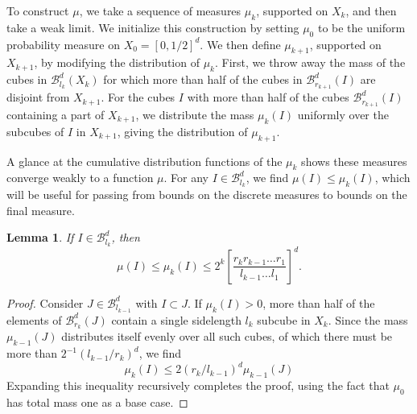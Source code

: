 \documentclass[dvipsnames]{article}
\theoremstyle{plain}
\newtheorem{lemma}{Lemma}
\theoremstyle{plain}
\begin{document}
To construct $\mu$, we take a sequence of measures $\mu_k$, supported on $X_k$, and then take a weak limit. We initialize this construction by setting $\mu_0$ to be the uniform probability measure on $X_0 = [0,1/2]^d$. We then define $\mu_{k+1}$, supported on $X_{k+1}$, by modifying the distribution of $\mu_k$. First, we throw away the mass of the cubes in $\mathcal{B}^d_{l_k}(X_k)$ for which more than half of the cubes in $\mathcal{B}^d_{r_{k+1}}(I)$ are disjoint from $X_{k+1}$. For the cubes $I$ with more than half of the cubes $\mathcal{B}^d_{r_{k+1}}(I)$ containing a part of $X_{k+1}$, we distribute the mass $\mu_k(I)$ uniformly over the subcubes of $I$ in $X_{k+1}$, giving the distribution of $\mu_{k+1}$.

A glance at the cumulative distribution functions of the $\mu_k$ shows these measures converge weakly to a function $\mu$. For any $I \in \mathcal{B}^d_{l_k}$, we find $\mu(I) \leq \mu_k(I)$, which will be useful for passing from bounds on the discrete measures to bounds on the final measure.

\begin{lemma}
	If $I \in \mathcal{B}^d_{l_k}$, then
	\begin{equation} \label{measurebound}
		\mu(I) \leq \mu_k(I) \leq 2^k \left[ \frac{r_k r_{k-1} \dots r_1}{l_{k-1} \dots l_1} \right]^d.
	\end{equation}
\end{lemma}
\begin{proof}
	Consider $J \in \mathcal{B}^d_{l_{k-1}}$ with $I \subset J$. If $\mu_k(I) > 0$, more than half of the elements of $\mathcal{B}^d_{r_k}(J)$ contain a single sidelength $l_k$ subcube in $X_k$. Since the mass $\mu_{k-1}(J)$ distributes itself evenly over all such cubes, of which there must be more than $2^{-1} (l_{k-1} / r_k)^d$, we find
	\[ \mu_k(I) \leq 2(r_k/l_{k-1})^d \mu_{k-1}(J) \]
	Expanding this inequality recursively completes the proof, using the fact that $\mu_0$ has total mass one as a base case.
\end{proof}
\end{document}
